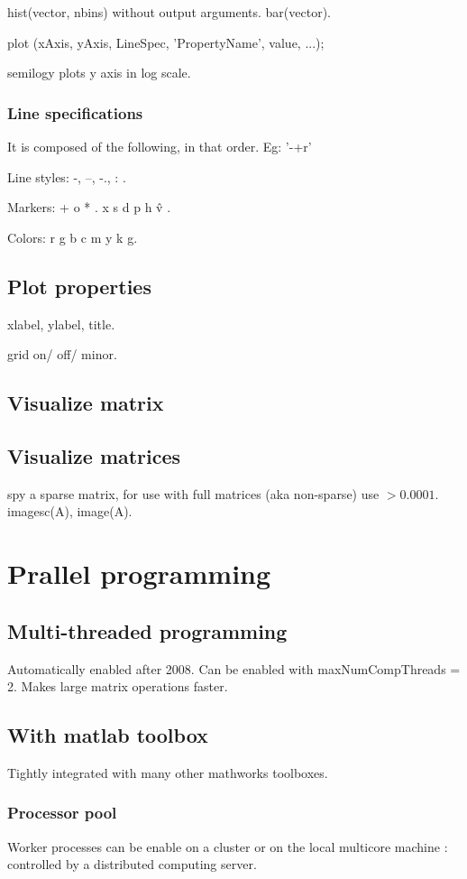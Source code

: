 hist(vector, nbins) without output arguments. bar(vector).

plot (xAxis, yAxis, LineSpec, 'PropertyName', value, ...);

semilogy plots y axis in log scale.

\subsubsection{Line specifications}
It is composed of the following, in that order. Eg: '-+r'

Line styles: -, --, -., : .

Markers: + o * . x s d p h \^ v .

Colors: r g b c m y k g.


\subsection{Plot properties}
xlabel, ylabel, title.

grid on/ off/ minor.

\subsection{Visualize matrix}
\subsection{Visualize matrices}
spy a sparse matrix, for use with full matrices (aka non-sparse) use $>0.0001$. imagesc(A), image(A).

\section{Prallel programming}
\subsection{Multi-threaded programming}
Automatically enabled after 2008. Can be enabled with maxNumCompThreads = 2. Makes large matrix operations faster.

\subsection{With matlab toolbox}
Tightly integrated with many other mathworks toolboxes.

\subsubsection{Processor pool}
Worker processes can be enable on a cluster or on the local multicore machine : controlled by a distributed computing server.

